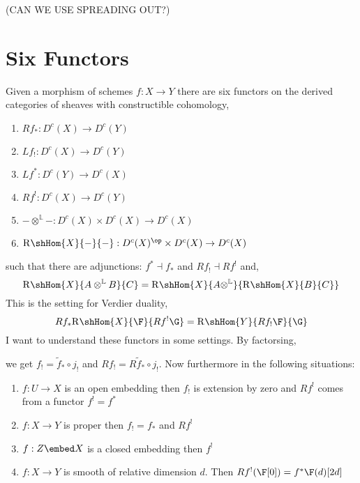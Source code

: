 \documentclass[12pt]{article}
\begin{document}
(CAN WE USE SPREADING OUT?)

\section{Six Functors}

\newcommand{\dtensor}{\otimes^{\mathbb{L}}}
\newcommand{\RHom}[3]{\mathrm{R}\shHom{#1}{#2}{#3}}

Given a morphism of schemes $f : X \to Y$ there are six functors on the derived categories of \etale sheaves with constructible cohomology,
\begin{enumerate}
\item $R f_* : D^c(X) \to D^c(Y)$
\item $L f_! : D^c(X) \to D^c(Y)$
\item $L f^* : D^c(Y) \to D^c(X)$
\item $R f^! : D^c(X) \to D^c(Y)$
\item $- \dtensor - : D^c(X) \times D^c(X) \to D^c(X)$
\item $\RHom{X}{-}{-} : D^c(X)^\op \times D^c(X) \to D^c(X)$
\end{enumerate}
such that there are adjunctions: $f^* \dashv f_*$ and $R f_! \dashv R f^!$ and,
\[ \RHom{X}{A \dtensor B}{C} = \RHom{X}{A \dtensor}{\RHom{X}{B}{C}} \]
This is the setting for Verdier duality,
\[ R f_* \RHom{X}{\F}{ R f^! \G} = \RHom{Y}{Rf_! \F}{\G} \]
I want to understand these functors in some settings. By factorsing,
\begin{center}
\end{center}
we get $f_! = \tilde{f}_* \circ j_!$ and $R f_! = R \tilde{f}_* \circ j_!$. Now furthermore in the following situations:
\begin{enumerate}
\item $f : U \to X$ is an open embedding then $f_!$ is extension by zero and $R f^!$ comes from a functor $f^! = f^*$
\item $f : X \to Y$ is proper then $f_! = f_*$ and $R f^!$
\item $f : Z \embed X$ is a closed embedding then $f^! $
\item $f : X \to Y$ is smooth of relative dimension $d$. Then $R f^!(\F[0]) = f^* \F(d) [2 d]$
\end{enumerate}
\end{document}
